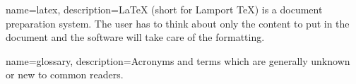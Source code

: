 











{
	name=latex,
	description={LaTeX (short for Lamport TeX) is a document preparation system. The user has to think about only the content to put in the document and the software will take care of the formatting. }
}

{
	name=glossary,
	description={Acronyms and terms which are generally unknown or new to common readers.}
}